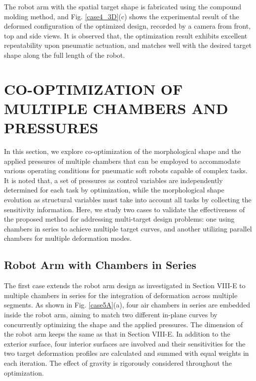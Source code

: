 \documentclass[journal]{IEEEtran}
\theoremstyle{definition}
\begin{document}
The robot arm with the spatial target shape is fabricated using the compound molding method, and Fig. \ref{case4_3D}(c) shows the experimental result of the deformed configuration of the optimized design, recorded by a camera from front, top and side views. It is observed that, the optimization result exhibits excellent repeatability upon pneumatic actuation, and matches well with the desired target shape along the full length of the robot.

\section{CO-OPTIMIZATION OF MULTIPLE CHAMBERS AND PRESSURES}
In this section, we explore co-optimization of the morphological shape and the applied pressures of multiple chambers that can be employed to accommodate various operating conditions for pneumatic soft robots capable of complex tasks. It is noted that, a set of pressures as control variables are independently determined for each task by optimization, while the morphological shape evolution as structural variables must take into account all tasks by collecting the sensitivity information. Here, we study two cases to validate the effectiveness of the proposed method for addressing multi-target design problems: one using chambers in series to achieve multiple target curves, and another utilizing parallel chambers for multiple deformation modes.


\subsection{Robot Arm with Chambers in Series}
The first case extends the robot arm design as investigated in Section VIII-E to multiple chambers in series for the integration of deformation across multiple segments. As shown in Fig. \ref{case5A}(a), four air chambers in series are embedded inside the robot arm, aiming to match two different in-plane curves by concurrently optimizing the shape and the applied pressures. The dimension of the robot arm keeps the same as that in Section VIII-E. In addition to the exterior surface, four interior surfaces are involved and their sensitivities for the two target deformation profiles are calculated and summed with equal weights in each iteration. The effect of gravity is rigorously considered throughout the optimization.
\end{document}
